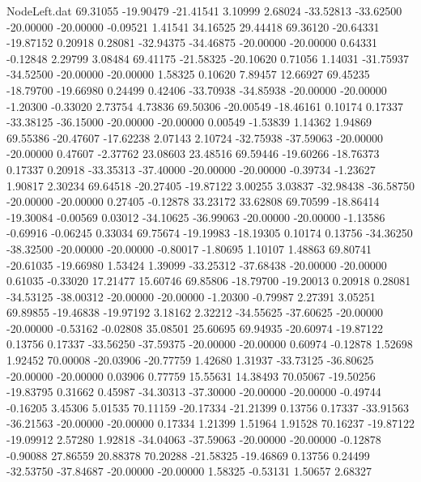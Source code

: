 \begin{filecontents}{NodeLeft.dat}
  69.31055  -19.90479  -21.41541     3.10999    2.68024  -33.52813  -33.62500  -20.00000  -20.00000   -0.09521    1.41541   34.16525   29.44418
  69.36120  -20.64331  -19.87152     0.20918    0.28081  -32.94375  -34.46875  -20.00000  -20.00000    0.64331   -0.12848    2.29799    3.08484
  69.41175  -21.58325  -20.10620     0.71056    1.14031  -31.75937  -34.52500  -20.00000  -20.00000    1.58325    0.10620    7.89457   12.66927
  69.45235  -18.79700  -19.66980     0.24499    0.42406  -33.70938  -34.85938  -20.00000  -20.00000   -1.20300   -0.33020    2.73754    4.73836
  69.50306  -20.00549  -18.46161     0.10174    0.17337  -33.38125  -36.15000  -20.00000  -20.00000    0.00549   -1.53839    1.14362    1.94869
  69.55386  -20.47607  -17.62238     2.07143    2.10724  -32.75938  -37.59063  -20.00000  -20.00000    0.47607   -2.37762   23.08603   23.48516
  69.59446  -19.60266  -18.76373     0.17337    0.20918  -33.35313  -37.40000  -20.00000  -20.00000   -0.39734   -1.23627    1.90817    2.30234
  69.64518  -20.27405  -19.87122     3.00255    3.03837  -32.98438  -36.58750  -20.00000  -20.00000    0.27405   -0.12878   33.23172   33.62808
  69.70599  -18.86414  -19.30084    -0.00569    0.03012  -34.10625  -36.99063  -20.00000  -20.00000   -1.13586   -0.69916   -0.06245    0.33034
  69.75674  -19.19983  -18.19305     0.10174    0.13756  -34.36250  -38.32500  -20.00000  -20.00000   -0.80017   -1.80695    1.10107    1.48863
  69.80741  -20.61035  -19.66980     1.53424    1.39099  -33.25312  -37.68438  -20.00000  -20.00000    0.61035   -0.33020   17.21477   15.60746
  69.85806  -18.79700  -19.20013     0.20918    0.28081  -34.53125  -38.00312  -20.00000  -20.00000   -1.20300   -0.79987    2.27391    3.05251
  69.89855  -19.46838  -19.97192     3.18162    2.32212  -34.55625  -37.60625  -20.00000  -20.00000   -0.53162   -0.02808   35.08501   25.60695
  69.94935  -20.60974  -19.87122     0.13756    0.17337  -33.56250  -37.59375  -20.00000  -20.00000    0.60974   -0.12878    1.52698    1.92452
  70.00008  -20.03906  -20.77759     1.42680    1.31937  -33.73125  -36.80625  -20.00000  -20.00000    0.03906    0.77759   15.55631   14.38493
  70.05067  -19.50256  -19.83795     0.31662    0.45987  -34.30313  -37.30000  -20.00000  -20.00000   -0.49744   -0.16205    3.45306    5.01535
  70.11159  -20.17334  -21.21399     0.13756    0.17337  -33.91563  -36.21563  -20.00000  -20.00000    0.17334    1.21399    1.51964    1.91528
  70.16237  -19.87122  -19.09912     2.57280    1.92818  -34.04063  -37.59063  -20.00000  -20.00000   -0.12878   -0.90088   27.86559   20.88378
  70.20288  -21.58325  -19.46869     0.13756    0.24499  -32.53750  -37.84687  -20.00000  -20.00000    1.58325   -0.53131    1.50657    2.68327

\end{filecontents}
